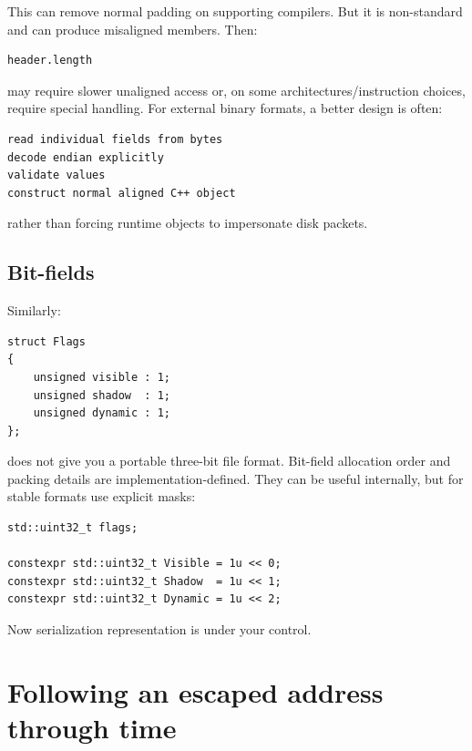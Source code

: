 This can remove normal padding on supporting compilers. But it is non-standard and can produce misaligned members. Then:

\begin{verbatim}
header.length
\end{verbatim}

may require slower unaligned access or, on some architectures/instruction choices, require special handling. For external binary formats, a better design is often:

\begin{verbatim}
read individual fields from bytes
decode endian explicitly
validate values
construct normal aligned C++ object
\end{verbatim}

rather than forcing runtime objects to impersonate disk packets.

\subsection{Bit-fields}\label{05-engine-i-ch003-bit-fields}

\hypertarget{05-engine-i-ch003-bit-fields}{}

Similarly:

\begin{verbatim}
struct Flags
{
    unsigned visible : 1;
    unsigned shadow  : 1;
    unsigned dynamic : 1;
};
\end{verbatim}

does not give you a portable three-bit file format. Bit-field allocation order and packing details are implementation-defined. They can be useful internally, but for stable formats use explicit masks:

\begin{verbatim}
std::uint32_t flags;

constexpr std::uint32_t Visible = 1u << 0;
constexpr std::uint32_t Shadow  = 1u << 1;
constexpr std::uint32_t Dynamic = 1u << 2;
\end{verbatim}

Now serialization representation is under your control.

\section{Following an escaped address through time}\label{05-engine-i-ch003-following-an-escaped-address-through-time}

\hypertarget{05-engine-i-ch003-following-an-escaped-address-through-time}{}

